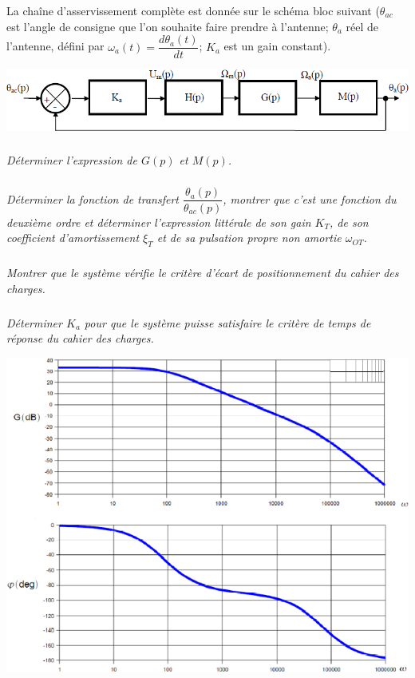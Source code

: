 \documentclass[10pt]{article}
\begin{document}
La chaîne d'asservissement complète est donnée sur le schéma bloc suivant ($\theta_{ac}$ est l'angle de consigne que l'on souhaite faire prendre à l'antenne; $\theta_a$ réel de l'antenne, défini par $\omega_a(t)=\dfrac{d\theta_a(t)}{dt}$; $K_a$ est un gain constant). 

\begin{center}
\includegraphics[width=.8\textwidth]{images/exo2_3}
\end{center}

\subparagraph{}
\textit{Déterminer l'expression de $G(p)$ et $M(p)$.}

\subparagraph{}
\textit{Déterminer la fonction de transfert $\dfrac{\theta_a(p)}{\theta_{ac}(p)}$, montrer que c'est une fonction du deuxième ordre et déterminer l'expression littérale de son gain $K_T$, de son coefficient d'amortissement $\xi_T$ et de sa pulsation propre non amortie $\omega_{OT}$.}

\subparagraph{}
\textit{Montrer que le système vérifie le critère d'écart de positionnement du cahier des charges.}

\subparagraph{}
\textit{Déterminer $K_a$ pour que le système puisse satisfaire le critère de temps de réponse du cahier des charges.}

\begin{center}
\includegraphics[width=.8\textwidth]{images/exo2_4}
\end{center}
\end{document}
